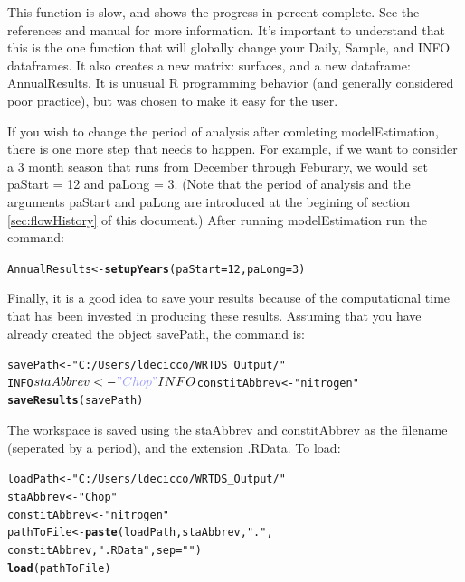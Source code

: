 \documentclass[a4paper,11pt]{article}\usepackage{graphicx, color}
\makeatletter
\newcommand{\hlfunctioncall}[1]{\textcolor[rgb]{0.501960784313725,0,0.329411764705882}{\textbf{#1}}}%
\newcommand{\hlstring}[1]{\textcolor[rgb]{0.6,0.6,1}{#1}}%
\newenvironment{kframe}{%
 \def\at@end@of@kframe{}%
 \ifinner\ifhmode%
  \def\at@end@of@kframe{\end{minipage}}%
  \begin{minipage}{\columnwidth}%
 \fi\fi%
 \def\FrameCommand##1{\hskip\@totalleftmargin \hskip-\fboxsep
 \colorbox{shadecolor}{##1}\hskip-\fboxsep
     \hskip-\linewidth \hskip-\@totalleftmargin \hskip\columnwidth}%
 \MakeFramed {\advance\hsize-\width
   \@totalleftmargin\z@ \linewidth\hsize
   \@setminipage}}%
 {\par\unskip\endMakeFramed%
 \at@end@of@kframe}
\newenvironment{knitrout}{}{} %
\makeatother
\begin{document}
This function is slow, and shows the progress in percent complete. See the references and manual for more information. It's important to understand that this is the one function that will globally change your Daily, Sample, and INFO dataframes. It also creates a new matrix: surfaces, and a new dataframe: AnnualResults. It is unusual R programming behavior (and generally considered poor practice), but was chosen to make it easy for the user.

If you wish to change the period of analysis after comleting modelEstimation, there is one more step that needs to happen.  For example, if we want to consider a 3 month season that runs from December through Feburary, we would set paStart = 12 and paLong = 3.  (Note that the period of analysis and the arguments paStart and paLong are introduced at the begining of section \ref{sec:flowHistory} of this document.) After running modelEstimation run the command:

\begin{knitrout}
\color{fgcolor}\begin{kframe}
\begin{alltt}
AnnualResults<-\hlfunctioncall{setupYears}(paStart=12,paLong=3)
\end{alltt}
\end{kframe}
\end{knitrout}



Finally, it is a good idea to save your results because of the computational time that has been invested in producing these results. Assuming that you have already created the object savePath, the command is:

\begin{knitrout}
\color{fgcolor}\begin{kframe}
\begin{alltt}
savePath <- \hlstring{"C:/Users/ldecicco/WRTDS_Output/"}
INFO$staAbbrev <- \hlstring{"Chop"}
INFO$constitAbbrev <- \hlstring{"nitrogen"}
\hlfunctioncall{saveResults}(savePath) 
\end{alltt}
\end{kframe}
\end{knitrout}


The workspace is saved using the staAbbrev and constitAbbrev as the filename (seperated by a period), and the extension .RData. To load:

\begin{knitrout}
\color{fgcolor}\begin{kframe}
\begin{alltt}
loadPath <- \hlstring{"C:/Users/ldecicco/WRTDS_Output/"}
staAbbrev <- \hlstring{"Chop"}
constitAbbrev <- \hlstring{"nitrogen"}
pathToFile <- \hlfunctioncall{paste}(loadPath,staAbbrev,\hlstring{"."},
                    constitAbbrev,\hlstring{".RData"},sep=\hlstring{""})
\hlfunctioncall{load}(pathToFile) 
\end{alltt}
\end{kframe}
\end{knitrout}
\end{document}
